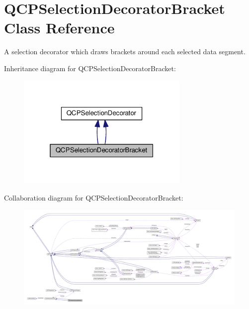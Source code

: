 \hypertarget{class_q_c_p_selection_decorator_bracket}{}\section{Q\+C\+P\+Selection\+Decorator\+Bracket Class Reference}
\label{class_q_c_p_selection_decorator_bracket}


A selection decorator which draws brackets around each selected data segment.  




Inheritance diagram for Q\+C\+P\+Selection\+Decorator\+Bracket\+:\nopagebreak
\begin{figure}[H]
\begin{center}
\leavevmode
\includegraphics[width=235pt]{class_q_c_p_selection_decorator_bracket__inherit__graph}
\end{center}
\end{figure}


Collaboration diagram for Q\+C\+P\+Selection\+Decorator\+Bracket\+:\nopagebreak
\begin{figure}[H]
\begin{center}
\leavevmode
\includegraphics[width=350pt]{class_q_c_p_selection_decorator_bracket__coll__graph}
\end{center}
\end{figure}
